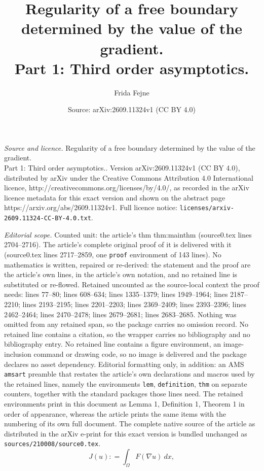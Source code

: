 \documentclass[10pt,a4paper]{amsart}
\title{Regularity of a free boundary determined by the value of the gradient.\\ Part 1: Third order asymptotics.}
\author{Frida Fejne}
\date{Source: arXiv:2609.11324v1 (CC BY 4.0)}
\begin{document}
\maketitle

\noindent\emph{Source and licence.} Regularity of a free boundary determined by the value of the gradient.\\ Part 1: Third order asymptotics.. Version arXiv:2609.11324v1 (CC BY 4.0), distributed by arXiv under the Creative Commons Attribution 4.0 International licence, http://creativecommons.org/licenses/by/4.0/, as recorded in the arXiv licence metadata for this exact version and shown on the abstract page https://arxiv.org/abs/2609.11324v1. Full licence notice: \texttt{licenses/arxiv-2609.11324-CC-BY-4.0.txt}.\par\smallskip

\noindent\textit{Editorial scope.} Counted unit: the article's thm thm:mainthm (source0.tex lines 2704--2716). The article's complete original proof of it is delivered with it (source0.tex lines 2717--2859, one \texttt{proof} environment of 143 lines). No mathematics is written, repaired or re-derived: the statement and the proof are the article's own lines, in the article's own notation, and no retained line is substituted or re-flowed.  Retained uncounted as the source-local context the proof needs: lines 77--80; lines 608--634; lines 1335--1379; lines 1949--1964; lines 2187--2210; lines 2193--2195; lines 2201--2203; lines 2369--2409; lines 2393--2396; lines 2462--2464; lines 2470--2478; lines 2679--2681; lines 2683--2685.  Nothing was omitted from any retained span, so the package carries no omission record.  No retained line contains a citation, so the wrapper carries no bibliography and no bibliography entry.  No retained line contains a figure environment, an image-inclusion command or drawing code, so no image is delivered and the package declares no asset dependency.  Editorial formatting only, in addition: an AMS \texttt{amsart} preamble that restates the article's own declarations and macros used by the retained lines, namely the environments \texttt{lem}, \texttt{definition}, \texttt{thm} on separate counters, together with the standard packages those lines need.  The retained environments print in this document as Lemma 1, Definition 1, Theorem 1 in order of appearance, whereas the article prints the same items with the numbering of its own full document.  The complete native source of the article as distributed in the arXiv e-print for this exact version is bundled unchanged as \texttt{sources/210008/source0.tex}.
\begin{equation}
\label{eq:varint}
    J(u) : = \int_{\Omega} F(\nabla u) \ dx,
\end{equation}
\end{document}
